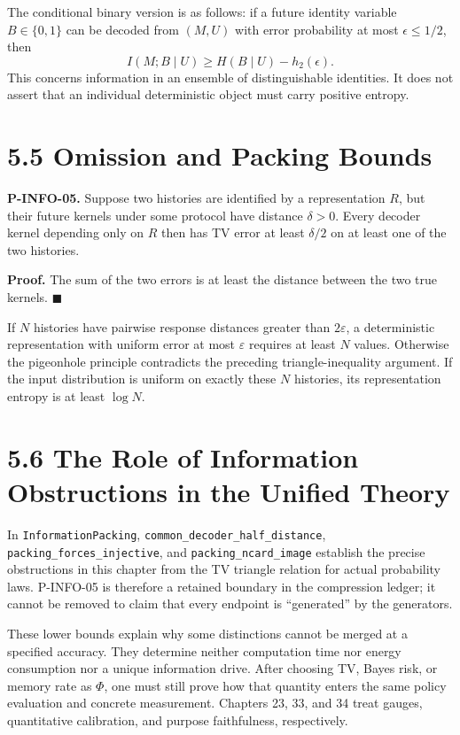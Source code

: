 \documentclass[
  english,
  11pt,
  oneside]{book}
\begin{document}
The conditional binary version is as follows: if a future identity variable \(B\in\{0,1\}\) can be decoded from \((M,U)\) with error probability at most \(\epsilon\le1/2\), then \[I(M;B\mid U)\ge H(B\mid U)-h_2(\epsilon).\] This concerns information in an ensemble of distinguishable identities. It does not assert that an individual deterministic object must carry positive entropy.

\section{5.5 Omission and Packing Bounds}\label{omission-and-packing-bounds}

\hypertarget{p-info-05}{}\label{p-info-05}

\textbf{P-INFO-05.} Suppose two histories are identified by a representation \(R\), but their future kernels under some protocol have distance \(\delta>0\). Every decoder kernel depending only on \(R\) then has TV error at least \(\delta/2\) on at least one of the two histories.

\textbf{Proof.} The sum of the two errors is at least the distance between the two true kernels. \(\blacksquare\)

If \(N\) histories have pairwise response distances greater than \(2\varepsilon\), a deterministic representation with uniform error at most \(\varepsilon\) requires at least \(N\) values. Otherwise the pigeonhole principle contradicts the preceding triangle-inequality argument. If the input distribution is uniform on exactly these \(N\) histories, its representation entropy is at least \(\log N\).

\section{5.6 The Role of Information Obstructions in the Unified Theory}\label{the-role-of-information-obstructions-in-the-unified-theory}

In \nolinkurl{InformationPacking}, \nolinkurl{common_decoder_half_distance}, \nolinkurl{packing_forces_injective}, and \nolinkurl{packing_ncard_image} establish the precise obstructions in this chapter from the TV triangle relation for actual probability laws. P-INFO-05 is therefore a retained boundary in the compression ledger; it cannot be removed to claim that every endpoint is ``generated'' by the generators.

These lower bounds explain why some distinctions cannot be merged at a specified accuracy. They determine neither computation time nor energy consumption nor a unique information drive. After choosing TV, Bayes risk, or memory rate as \(\Phi\), one must still prove how that quantity enters the same policy evaluation and concrete measurement. Chapters 23, 33, and 34 treat gauges, quantitative calibration, and purpose faithfulness, respectively.
\end{document}
